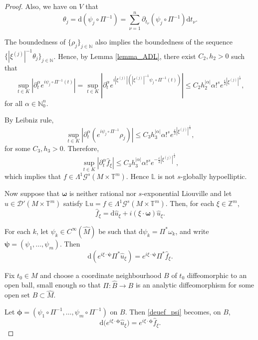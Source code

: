 \documentclass[11pt,reqno]{amsart}
\numberwithin{equation}{section}
\begin{document}
\begin{proof}
	Also, we have on $V$ that
	\[\theta_j = \mathrm{d}(\psi_j\circ\Pi^{-1}) = \sum_{\nu=1}^{n}\partial_{t_\nu}(\psi_j\circ\Pi^{-1})\mathrm{d}t_\nu.\]
	
	The boundedness of $\{\rho_j\}_{j\in\mathbb{N}}$ also implies the boundedness of the sequence $\{|\xi^{(j)}|^{-1}\theta_j\}_{j\in\mathbb{N}}$. 
	Hence, by Lemma \ref{lemma_ADL}, there exist $C_2,h_2>0$ such that
	\[
	\sup_{t\in K}|\partial_t^\alpha e^{i\psi_j\circ\Pi^{-1}(t)}| = \sup_{t\in K}|\partial_t^\alpha e^{i|\xi^{(j)}|(|\xi^{(j)}|^{-1}\psi_j\circ\Pi^{-1}(t))}| \leq C_2h_2^{|\alpha|}\alpha!^s e^{\frac{\varepsilon}{2}| \xi^{(j)}|^{\frac{1}{s}}},
	\]
	for all $\alpha \in \mathbb{N}_0^n.$
	
	By Leibniz rule,
	\[
	\sup_{t\in K}|\partial_t^\alpha(e^{i\psi_j\circ\Pi^{-1}}\rho_j)|
	\leq C_3h_3^{|\alpha|}\alpha!^s e^{\frac{\varepsilon}{2}|\xi^{(j)}|^{\frac{1}{s}}},
	\]
	for some $C_3,h_3>0$. Therefore,
	\[
	\sup_{t\in K}|\partial_t^{\alpha}\widehat{f}_\xi|
	\leq C_3h_3^{|\alpha|}\alpha!^s e^{-\frac{\varepsilon}{2}|\xi^{(j)}|^{\frac{1}{s}}},
	\]
	which implies that $f\in\mathsf{\Lambda}^1\mathscr{G}^s(M\times\mathbb{T}^m)$. 
	Hence $\mathbb{L}$ is not $s$-globally hypoelliptic.
	
	\medskip

	Now suppose that $\boldsymbol{\omega}$ is neither rational nor $s$-exponential Liouville and let 
	$u\in\mathscr{D}'(M\times\mathbb{T}^m)$ satisfy 
	$\mathbb{L}u=f\in\mathsf{\Lambda}^1\mathscr{G}^s(M\times\mathbb{T}^m)$. 
	Then, for each $\xi\in\mathbb{Z}^m$,
	\[
	\widehat{f}_\xi = \mathrm{d}\widehat{u}_\xi + i(\xi\cdot \boldsymbol{\omega}) \widehat{u}_\xi.
	\]
	
	For each $k$, let $\psi_k\in C^\infty(\hat M)$ be such that 
	$\mathrm{d}\psi_k = \Pi^*\omega_k$, and write 
	$\boldsymbol{\psi}=(\psi_1,\dots,\psi_m)$. 
	Then
	\begin{equation}\label{deuef_psi}
	\mathrm{d}(e^{i\xi\cdot\boldsymbol{\psi}}\Pi^*\widehat{u}_\xi)
	=	e^{i\xi\cdot\boldsymbol{\psi}}\Pi^*\widehat{f}_\xi.
	\end{equation}

	Fix $t_0\in M$ and choose a coordinate neighbourhood $B$ of $t_0$
	diffeomorphic to an open ball, small enough so that
	$\Pi:\hat B\to B$ is an analytic diffeomorphism
	for some open set $\hat B\subset\hat M$.
	
	Let $\boldsymbol{\phi} 	= (\psi_1\circ\Pi^{-1},\dots,\psi_m\circ\Pi^{-1})$ on $B$. Then \eqref{deuef_psi} becomes, on $B$,
	\begin{equation}\label{deuef_local}
		\mathrm{d}	\big( e^{i\xi\cdot\boldsymbol{\phi}} \widehat{u}_\xi
		\big) = e^{i\xi\cdot\boldsymbol{\phi}} 	\widehat{f}_\xi.
	\end{equation}
	

\end{proof}
\end{document}
